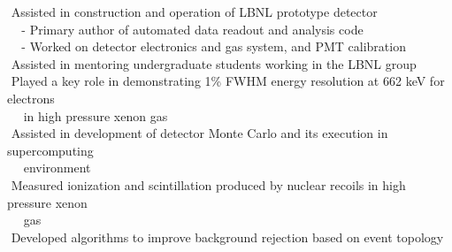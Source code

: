 \indent\hspace{0.2 cm}\textbullet\,\,Assisted in construction and operation of LBNL prototype detector\\
\indent\hspace{0.2 cm}\,\,\,\,\,\,\,- Primary author of automated data readout and analysis code\\
\indent\hspace{0.2 cm}\,\,\,\,\,\,\,- Worked on detector electronics and gas system, and PMT calibration\\
\indent\hspace{0.2 cm}\textbullet\,\,Assisted in mentoring undergraduate students working in the LBNL group\\
\indent\hspace{0.2 cm}\textbullet\,\,Played a key role in demonstrating 1\% FWHM energy resolution at 662 keV for electrons\\
\indent\hspace{0.2 cm}\,\,\,\,\,\,\,\,in high pressure xenon gas\\
\indent\hspace{0.2 cm}\textbullet\,\,Assisted in development of detector Monte Carlo and its execution in supercomputing\\
\indent\hspace{0.2 cm}\,\,\,\,\,\,\,\,environment\\
\indent\hspace{0.2 cm}\textbullet\,\,Measured ionization and scintillation produced by nuclear recoils in high pressure xenon\\
\indent\hspace{0.2 cm}\,\,\,\,\,\,\,\,gas\\
\indent\hspace{0.2 cm}\textbullet\,\,Developed algorithms to improve background rejection based on event topology\\